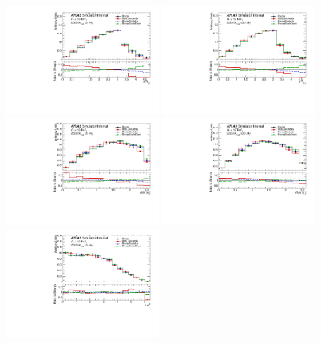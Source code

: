 \begin{figure}[!htb]
\centering
\includegraphics[width=0.45\textwidth]{Plots/ttV/shape/c_Region_0_DRll01}
\includegraphics[width=0.45\textwidth]{Plots/ttV/shape/c_Region_1_DRll01}\\
\includegraphics[width=0.45\textwidth]{Plots/ttV/shape/c_Region_0_maxEta_ll} 
\includegraphics[width=0.45\textwidth]{Plots/ttV/shape/c_Region_1_maxEta_ll}\\
\includegraphics[width=0.45\textwidth]{Plots/ttV/shape/c_Region_0_lep_dPhi} 

\end{figure}
